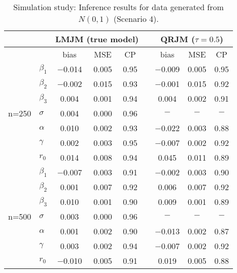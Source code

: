 \begin{table}[H]
\centering
\caption{Simulation study: Inference results for data generated from $N(0, 1)$ (Scenario 4).}
\label{tab:p2simsce4}
\begin{tabular}{clccccccc}
\hline
& & \multicolumn{3}{c}{LMJM (true model)} & & \multicolumn{3}{c}{QRJM ($\tau=0.5$)}\\
\hline
 & & bias & MSE & CP && bias & MSE & CP \\
 \cline{3-5}  \cline{7-9}
   \multirow{7}{*}{n=250} & $\beta_1$ & $-$0.014 & 0.005 & 0.95 && $-$0.009 & 0.005 & 0.95 \\
  &   $\beta_2$ & $-$0.002 & 0.015 & 0.93 && $-$0.001 & 0.015 & 0.92 \\
  &   $\beta_3$ & 0.004 & 0.001 & 0.94 && 0.004 & 0.002 & 0.91 \\
  &   $\sigma$ & 0.004 & 0.000 & 0.96 &&  $-$ & $-$ & $-$ \\
  &   $\alpha$ & 0.010 & 0.002 & 0.93 && $-$0.022 & 0.003 & 0.88 \\
  &   $\gamma$ & 0.002 & 0.003 & 0.95 && $-$0.007 & 0.002 & 0.92 \\
  &   $r_0$ & 0.014 & 0.008 & 0.94 && 0.045 & 0.011 & 0.89 \\
   \hline
  \multirow{7}{*}{n=500} & $\beta_1$ & $-$0.007 & 0.003 & 0.91 && $-$0.002 & 0.003 & 0.90 \\
  & $\beta_2$ & 0.001 & 0.007 & 0.92 && 0.006 & 0.007 & 0.92 \\
  & $\beta_3$ & 0.010 & 0.001 & 0.90 && 0.009 & 0.001 & 0.89 \\
  & $\sigma$ & 0.003 & 0.000 & 0.96 &&  $-$ & $-$ & $-$ \\
  & $\alpha$ & 0.001 & 0.002 & 0.90 && $-$0.013 & 0.002 & 0.87 \\
  & $\gamma$ & 0.003 & 0.002 & 0.94 && $-$0.007 & 0.002 & 0.92 \\
  & $r_0$ & $-$0.010 & 0.005 & 0.91 && 0.019 & 0.005 & 0.88 \\
   \hline
\end{tabular}
\end{table}




%
%
%
%
% 

% 